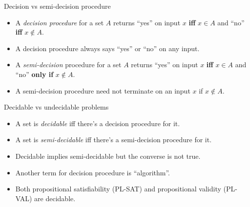 \documentclass[style=sailor,size=12pt]{powerdot}
\begin{document}
\begin{wideslide}[bm=,toc=]{Decision vs semi-decision procedure}
\begin{itemize}
\item A {\em decision procedure\/} for a set $A$ returns ``yes'' on input $x$ 
{\bf iff} $x\in A$ and ``no'' {\bf iff} $x\not\in A$.
\item A decision procedure always says ``yes'' or ``no'' on any input.
\item A {\em semi-decision\/} procedure for a set $A$ returns ``yes'' on input $x$
{\bf iff} $x\in A$ and ``no'' {\bf only if} $x\not\in A$.
\item A semi-decision procedure need not terminate on an input $x$ if $x\not\in A$.
\end{itemize}
\end{wideslide}


\begin{wideslide}[bm=,toc=]{Decidable vs undecidable problems}
\begin{itemize}
\item A set is {\em decidable\/} iff there's a decision procedure for it.
\item A set is {\em semi-decidable\/} iff there's a semi-decision procedure for it.
\item Decidable implies semi-decidable but the converse is not true.
\item Another term for decision procedure is ``algorithm''.
\item Both propositional satisfiability (PL-SAT) and propositional validity (PL-VAL) are decidable.
\end{itemize}
\end{wideslide}
\end{document}

